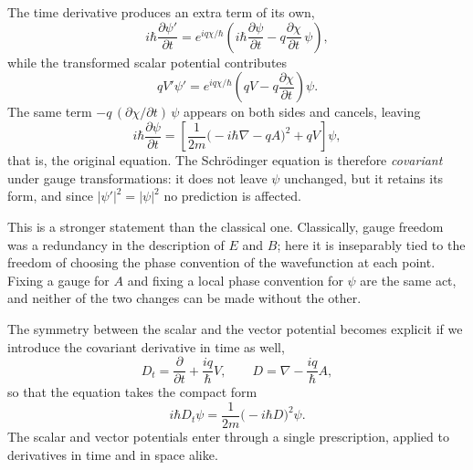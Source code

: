 The time derivative produces an extra term of its own,
\[
	i\hbar\frac{\partial\psi'}{\partial t}
	= e^{iq\chi/\hbar}\left(i\hbar\frac{\partial\psi}{\partial t}
	- q\frac{\partial\chi}{\partial t}\,\psi\right),
\]
while the transformed scalar potential contributes
\[
	qV'\psi' = e^{iq\chi/\hbar}\left(qV - q\frac{\partial\chi}{\partial t}\right)\psi .
\]
The same term $-q\,(\partial\chi/\partial t)\,\psi$ appears on both sides and cancels,
leaving
\[
	i\hbar\frac{\partial\psi}{\partial t}
	= \left[\frac{1}{2m}\bigl(-i\hbar\nabla - qA\bigr)^{2} + qV\right]\psi ,
\]
that is, the original equation. The Schrödinger equation is therefore \emph{covariant}
under gauge transformations: it does not leave $\psi$ unchanged, but it retains its
form, and since $|\psi'|^{2} = |\psi|^{2}$ no prediction is affected.

This is a stronger statement than the classical one. Classically, gauge freedom was a
redundancy in the description of $E$ and $B$; here it is inseparably tied to the
freedom of choosing the phase convention of the wavefunction at each point. Fixing a
gauge for $A$ and fixing a local phase convention for $\psi$ are the same act, and
neither of the two changes can be made without the other.

The symmetry between the scalar and the vector potential becomes explicit if we
introduce the covariant derivative in time as well,
\[
	D_{t} = \frac{\partial}{\partial t} + \frac{iq}{\hbar}V ,
	\qquad
	D = \nabla - \frac{iq}{\hbar}A ,
\]
so that the equation takes the compact form
\[
	i\hbar D_{t}\psi = \frac{1}{2m}\bigl(-i\hbar D\bigr)^{2}\psi .
\]
The scalar and vector potentials enter through a single prescription, applied to
derivatives in time and in space alike.
